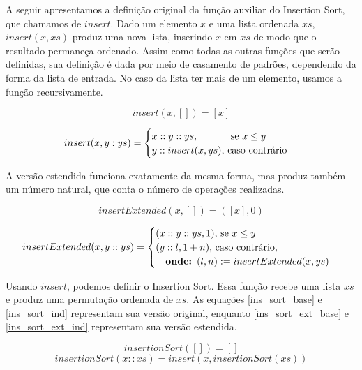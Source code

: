 \documentclass[12pt, oneside, a4paper,english,brazil]{abntex2}
\begin{document}
\qquad A seguir apresentamos a defini\c{c}\~ao original da fun\c{c}\~ao auxiliar do
Insertion Sort, que chamamos de $insert$. Dado um elemento $x$ e uma lista ordenada $xs$,
$insert(x,xs)$ produz uma nova lista, inserindo $x$ em $xs$ de modo que o resultado
permane\c{c}a ordenado. Assim como todas as outras fun\c{c}\~oes que ser\~ao definidas,
sua defini\c{c}\~ao \'e dada por meio de casamento de padr\~oes,
dependendo da forma da lista de entrada. No caso da lista ter mais de um elemento, usamos
a fun\c{c}\~ao recursivamente.

\begin{equation} \label{ins_base}
insert(x, []) = [x]
\end{equation}

\begin{equation} \label{ins_ind}
insert(x, y : ys) =
  \begin{cases}
    x :: y :: ys \text{, \qquad\,\,\,\,\, se } x \le y\\
    y :: insert(x, ys) \text{, caso contr\'ario}
  \end{cases}
\end{equation}

\qquad A vers\~ao estendida funciona exatamente da mesma forma, mas produz tamb\'em um
n\'umero natural, que conta o n\'umero de opera\c{c}\~oes realizadas.

\begin{equation} \label{ins_ext_base}
insertExtended(x, []) = ([x], 0)
\end{equation}

\begin{equation} \label{ins_ext_ind}
insertExtended(x, y :: ys) =
  \begin{cases}
    (x :: y :: ys, 1) \text{, se } x \le y\\
    (y :: l, 1 + n) \text{, caso contr\'ario,}\\ \text{\quad \textbf{onde: }} (l, n) := insertExtended(x, ys)
  \end{cases}
\end{equation}

\qquad Usando $insert$, podemos definir o Insertion Sort.
Essa fun\c{c}\~ao recebe uma lista $xs$ e produz uma permuta\c{c}\~ao ordenada de $xs$.
As equa\c{c}\~oes \ref{ins_sort_base} e \ref{ins_sort_ind} representam sua vers\~ao original, enquanto
\ref{ins_sort_ext_base} e \ref{ins_sort_ext_ind} representam sua vers\~ao estendida.

\begin{equation} \label{ins_sort_base}
insertionSort([]) = []
\end{equation}
\begin{equation} \label{ins_sort_ind}
insertionSort(x :: xs) = insert(x, insertionSort(xs))
\end{equation}
\end{document}
